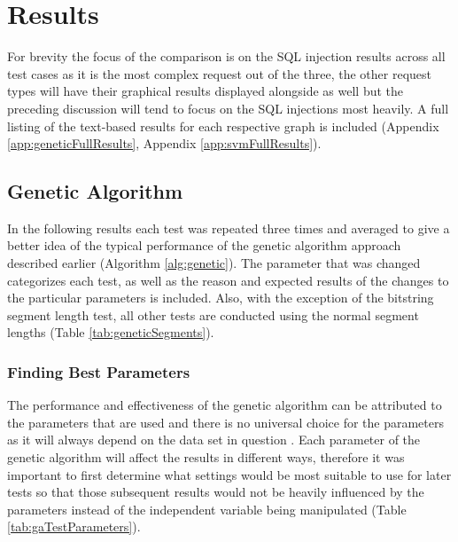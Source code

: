 \chapter{Results}

For brevity the focus of the comparison is on the SQL injection results across all test cases as it is the most complex request out of the three, the other request types will have their graphical results displayed alongside as well but the preceding discussion will tend to focus on the SQL injections most heavily.  A full listing of the text-based results for each respective graph is included (Appendix \ref{app:geneticFullResults}, Appendix \ref{app:svmFullResults}).

\section{Genetic Algorithm}

In the following results each test was repeated three times and averaged to give a better idea of the typical performance of the genetic algorithm approach described earlier (Algorithm \ref{alg:genetic}).  The parameter that was changed categorizes each test, as well as the reason and expected results of the changes to the particular parameters is included.  Also, with the exception of the bitstring segment length test, all other tests are conducted using the normal segment lengths (Table \ref{tab:geneticSegments}).

\subsection{Finding Best Parameters}

The performance and effectiveness of the genetic algorithm can be attributed to the parameters that are used and there is no universal choice for the parameters as it will always depend on the data set in question \cite{optimalPopulationGenetic}.  Each parameter of the genetic algorithm will affect the results in different ways, therefore it was important to first determine what settings would be most suitable to use for later tests so that those subsequent results would not be heavily influenced by the parameters instead of the independent variable being manipulated (Table \ref{tab:gaTestParameters}).

